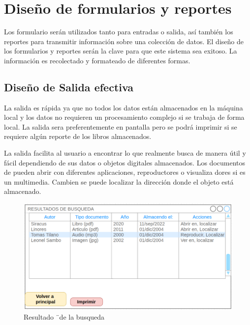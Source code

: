 \chapter*{Diseño de formularios y reportes}
Los formulario serán utilizados tanto para entradas o salida, así también los reportes para transmitir información sobre una colección de datos. El diseño de los formularios y reportes serán la clave para que este sistema sea exitoso. La información es recolectado y formateado de diferentes formas. 
\section{Diseño de Salida efectiva}
La salida es rápida ya que no todos los datos están almacenados en la máquina local y los datos no requieren un procesamiento complejo si se trabaja de forma local. La salida sera preferentemente en pantalla pero se podrá imprimir  si se requiere algún reporte de los libros almacenados. 

La salida facilita al usuario a encontrar lo que realmente busca de manera útil y fácil dependiendo de sus datos o objetos digitales almacenados. Los documentos de pueden abrir con diferentes aplicaciones, reproductores o visualiza dores si es un multimedia. Cambien se puede localizar la dirección donde el objeto está almacenado. 

\begin{figure}[ht]
	\centering
	\includegraphics[scale=0.50]{images/resultadoBusqueda1}
	\caption{Resultado ¨de la busqueda}
\end{figure}

